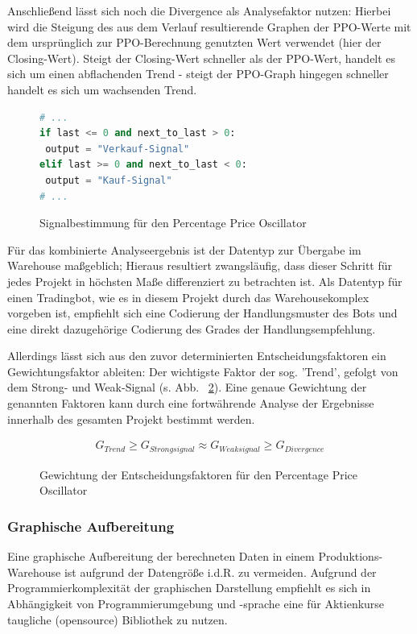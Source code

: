 Anschließend lässt sich noch die Divergence als Analysefaktor nutzen: Hierbei wird die Steigung des aus dem Verlauf resultierende Graphen der PPO-Werte mit dem ursprünglich zur PPO-Berechnung genutzten Wert verwendet (hier der Closing-Wert). Steigt der Closing-Wert schneller als der PPO-Wert, handelt es sich um einen abflachenden Trend - steigt der PPO-Graph hingegen schneller handelt es sich um wachsenden Trend. 

\begin{figure}[!ht]
\begin{lstlisting}[language=Python,numbers=auto]
# ...
if last <= 0 and next_to_last > 0:
 output = "Verkauf-Signal"
elif last >= 0 and next_to_last < 0:
 output = "Kauf-Signal"
# ...
\end{lstlisting}
\caption{Signalbestimmung für den Percentage Price Oscillator}
\label{fig:signalbestimmung_ppo}
\end{figure}

\label{subsubsec_analysis_comb_ppo}
Für das kombinierte Analyseergebnis ist der Datentyp zur Übergabe im Warehouse maßgeblich; Hieraus resultiert zwangsläufig, dass dieser Schritt für jedes Projekt in höchsten Maße differenziert zu betrachten ist. Als Datentyp für einen Tradingbot, wie es in diesem Projekt durch das Warehousekomplex vorgeben ist, empfiehlt sich eine Codierung der Handlungsmuster des Bots und eine direkt dazugehörige Codierung des Grades der Handlungsempfehlung.

Allerdings lässt sich aus den zuvor determinierten Entscheidungsfaktoren ein Gewichtungsfaktor ableiten: Der wichtigste Faktor der sog. 'Trend', gefolgt von dem Strong- und Weak-Signal (s. Abb. ~\ref{fig:faktorenhierrachie_ppo}). Eine genaue Gewichtung der genannten Faktoren kann durch eine fortwährende Analyse der Ergebnisse innerhalb des gesamten Projekt bestimmt werden.

\begin{figure}[!ht]
\begin{eqnarray}
G_{Trend} \geq  G_{Strongsignal} \approx G_{Weaksignal} \geq G_{Divergence}\nonumber
\end{eqnarray}
\caption{Gewichtung der Entscheidungsfaktoren für den Percentage Price Oscillator}
\label{fig:faktorenhierrachie_ppo}
\end{figure}

\subsubsection{Graphische Aufbereitung}
Eine graphische Aufbereitung der berechneten Daten in einem Produktions-Warehouse ist aufgrund der Datengröße i.d.R. zu vermeiden. Aufgrund der Programmierkomplexität der graphischen Darstellung empfiehlt es sich in Abhängigkeit von Programmierumgebung und -sprache eine für Aktienkurse taugliche (opensource) Bibliothek zu nutzen. 

